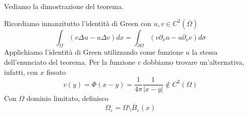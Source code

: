 \documentclass[10pt,a4paper,twoside,openright]{book}
\begin{document}
Vediamo la dimostrazione del teorema.
\begin{dimostrazione}
	Ricordiamo innanzitutto l'identità di Green con $\displaystyle u,v\in C^{2}(\overline{\Omega })$
	\begin{equation*}
		\int _{\Omega }( v\Delta u-u\Delta v) dx=\int _{\partial \Omega }( v\partial _{\nu } u-u\partial _{\nu } v) d\sigma 
	\end{equation*}
	Applichiamo l'identità di Green utilizzando come funzione $\displaystyle u$ la stessa dell'enunciato del teorema. Per la funzione $\displaystyle v$ dobbiamo trovare un'alternativa, infatti, con $\displaystyle x$ fissato
	\begin{equation*}
		v(y) =\Phi (x-y) =\frac{1}{4\pi }\frac{1}{| x-y| } \notin C^{2}(\Omega)
	\end{equation*}
	Con $\displaystyle \Omega $ dominio limitato, definisco 
	\begin{equation*}
		\Omega _{\varepsilon } =\Omega \setminus \overline{B}_{\varepsilon }(x)
	\end{equation*}
	
	\begin{figure}[H]
		\centering

		\begin{tikzpicture}[x=0.75pt,y=0.75pt,yscale=-1,xscale=1]


\end{tikzpicture}
\end{figure}
\end{dimostrazione}
\end{document}
